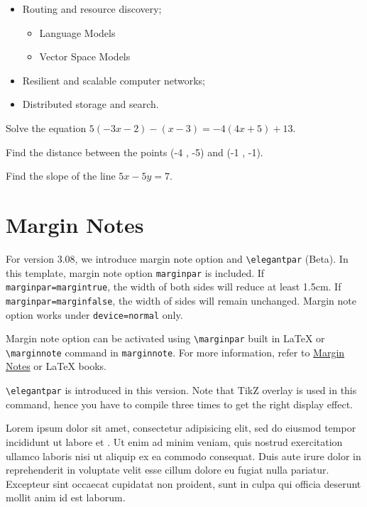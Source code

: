 \documentclass[fancy,blue,11pt]{elegantbook}
\begin{document}
\lipsum[1-2]

\begin{itemize}
	\item Routing and resource discovery;
	     \begin{itemize} 
      	   	\item Language Models
       	 	\item Vector Space Models
    		 \end{itemize}
	\item Resilient and scalable computer networks;
	\item Distributed storage and search.
\end{itemize}

\begin{problemset}
	\item Solve the equation $5(- 3x - 2) - (x - 3) = -4(4x + 5) + 13$.
	\item Find the distance between the points (-4 , -5) and (-1 , -1). 
	\item Find the slope of the line $5x - 5y = 7$.
\end{problemset}

\chapter{Margin Notes}
For version 3.08, we introduce margin note option and \lstinline{\elegantpar} (Beta). In this template, margin note option \lstinline{marginpar} is included. If \lstinline{marginpar=margintrue}, the width of both sides will reduce at least 1.5cm. If \lstinline{marginpar=marginfalse}, the width of sides will remain unchanged. Margin note option works under \lstinline{device=normal} only.

Margin note option can be activated using \lstinline{\marginpar} built in \LaTeX{} or \lstinline{\marginnote} command in \lstinline{marginnote}. For more information, refer to \href{https://en.wikibooks.org/wiki/LaTeX/Footnotes_and_Margin_Notes#Margin_Notes}{Margin Notes} or \LaTeX{} books.

\lstinline{\elegantpar} is introduced in this version. Note that TikZ overlay is used in this command, hence you have to compile three times to get the right display effect.

Lorem ipsum dolor sit amet, consectetur adipisicing elit, sed do eiusmod
tempor incididunt ut labore et . Ut enim ad minim veniam,
quis nostrud exercitation ullamco laboris nisi ut aliquip ex ea commodo
consequat. Duis aute irure dolor in reprehenderit in voluptate velit esse
cillum dolore eu fugiat nulla pariatur. Excepteur sint occaecat cupidatat non
proident, sunt in culpa qui officia deserunt mollit anim id est laborum.
\end{document}

